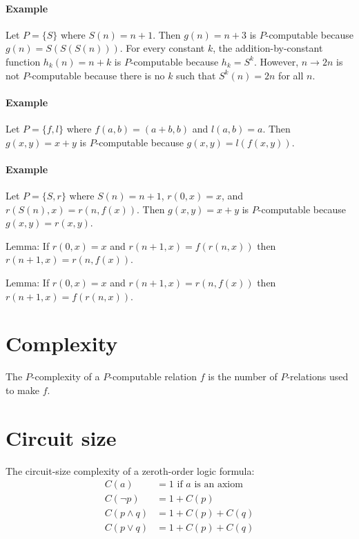 \paragraph{Example}
Let \(P = \{S\}\) where \(S(n) = n+1\).
Then \(g(n) = n + 3\) is \(P\)-computable because \(g(n) = S(S(S(n)))\).
For every constant \(k\), the addition-by-constant function \(h_k(n) = n+k\) is \(P\)-computable because \(h_k = S^k\).
However, \(n \to 2n\) is not \(P\)-computable
because there is no \(k\) such that \(S^k(n) = 2n\) for all \(n\).

\paragraph{Example}
Let \(P = \{f,l\}\) where \(f(a,b) = (a+b,b)\) and \(l(a,b) = a\).
Then \(g(x,y) = x+y\) is \(P\)-computable because \(g(x,y) = l(f(x,y))\).

\paragraph{Example}
Let \(P = \{S,r\}\) where \(S(n)=n+1\), \(r(0,x) = x\), and \(r(S(n),x) = r(n,f(x))\).
Then \(g(x,y) = x+y\) is \(P\)-computable because \(g(x,y) = r(x,y)\).

Lemma:
If \(r(0,x) = x\) and \(r(n+1,x) = f(r(n,x))\) then \(r(n+1,x) = r(n,f(x))\).

Lemma:
If \(r(0,x) = x\) and \(r(n+1,x) = r(n,f(x))\) then \(r(n+1,x) = f(r(n,x))\).

\section{Complexity}

The \(P\)-complexity of a \(P\)-computable relation \(f\)
is the number of \(P\)-relations used to make \(f\).

\section{Circuit size}

The circuit-size complexity of a zeroth-order logic formula:
\begin{align*}
    C(a) &= 1 \text{ if \(a\) is an axiom}
    \\
    C(\neg p) &= 1 + C(p)
    \\
    C(p \wedge q) &= 1 + C(p) + C(q)
    \\
    C(p \vee q) &= 1 + C(p) + C(q)
\end{align*}


